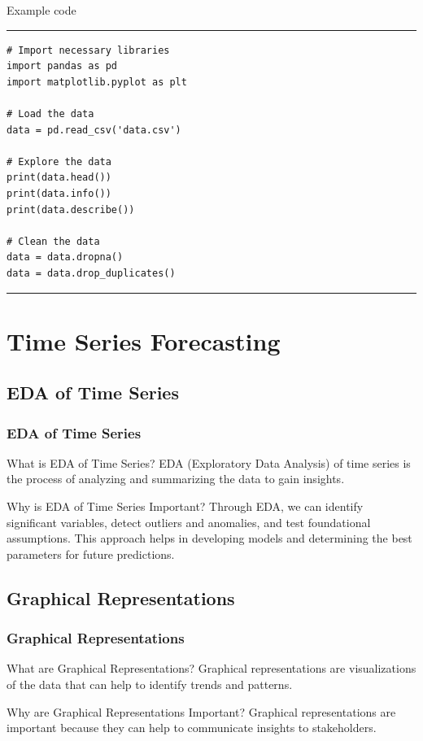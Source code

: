 \documentclass[aspectratio=169, hideothersubsections]{beamer}
\begin{document}
\begin{frame}[fragile]{Example code}
\rule{\textwidth}{1pt}    
\scriptsize
\begin{verbatim}
# Import necessary libraries
import pandas as pd
import matplotlib.pyplot as plt

# Load the data
data = pd.read_csv('data.csv')

# Explore the data
print(data.head())
print(data.info())
print(data.describe())

# Clean the data
data = data.dropna()
data = data.drop_duplicates()
\end{verbatim}
\rule{\textwidth}{1pt}    
\end{frame}

\section{Time Series Forecasting}

\subsection{EDA of Time Series}

\begin{frame}
  \frametitle{EDA of Time Series}
  \begin{block}{What is EDA of Time Series?}
    EDA (Exploratory Data Analysis) of time series is the process of analyzing and summarizing the data to gain insights.
  \end{block}
  \begin{block}{Why is EDA of Time Series Important?}
    Through EDA, we can identify significant variables, detect outliers and anomalies, and test foundational assumptions. This approach helps in developing models and determining the best parameters for future predictions.
  \end{block}
\end{frame}

\subsection{Graphical Representations}

\begin{frame}
  \frametitle{Graphical Representations}
  \begin{block}{What are Graphical Representations?}
    Graphical representations are visualizations of the data that can help to identify trends and patterns.
  \end{block}
  \begin{block}{Why are Graphical Representations Important?}
    Graphical representations are important because they can help to communicate insights to stakeholders.
  \end{block}
\end{frame}
\end{document}
